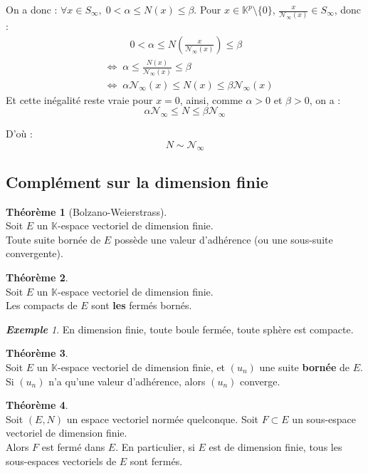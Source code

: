 \documentclass[12pt]{book}
\let\ensembleNombre\mathbb
\newcommand*\K{\ensuremath{\ensembleNombre{K}}}
\theoremstyle{definition}
\newtheorem{thme}{Théorème}[chapter]
\theoremstyle{remark}
\newtheorem*{ex}{\textbf{Exemple}}
\newenvironment{fthme}
  {\begin{mdframed}[roundcorner=10pt, linewidth=2pt]\begin{thme}}
  {\end{thme}\end{mdframed}}
\begin{document}
	On a donc : $\forall x \in S_\infty,\; 0 < \alpha \leq N(x) \leq \beta$. Pour $x \in \K^p \setminus \lbrace 0 \rbrace$, $\frac{x}{\mathcal N_\infty (x)} \in S_\infty$, donc :
	\begin{align*}
	&\;\;\qquad 0 < \alpha \leq N\left( \frac{x}{\mathcal N_\infty (x)} \right) \leq \beta \\
	&\Longleftrightarrow\; \alpha \leq \frac{N(x)}{\mathcal N_\infty (x)} \leq \beta \\
	&\Longleftrightarrow\; \alpha \mathcal N_\infty(x) \leq N(x) \leq \beta \mathcal N_\infty (x)
	\end{align*}
	Et cette inégalité reste vraie pour $x = 0$, ainsi, comme $\alpha > 0$ et $\beta > 0$, on a :
	\[ \alpha \mathcal N_\infty \leq N \leq \beta \mathcal N_\infty\]
	
	D'où : 
	\[\boxed{ N \sim \mathcal N_\infty}\]
	
	\subsection{Complément sur la dimension finie}
	\begin{fthme}[Bolzano-Weierstrass]\mbox{~}\\
	Soit $E$ un $\K$-espace vectoriel de dimension finie.\\
	Toute suite bornée de $E$ possède une valeur d'adhérence (ou une sous-suite convergente).
	\end{fthme}
	
	\begin{fthme}\mbox{~}\\
	Soit $E$ un $\K$-espace vectoriel de dimension finie.\\
	Les compacts de $E$ sont \textbf{les} fermés bornés.
	\end{fthme}
	
	\begin{ex}
	En dimension finie, toute boule fermée, toute sphère est compacte.
	\end{ex}
	
	\begin{fthme}\mbox{~}\\
	Soit $E$ un $\K$-espace vectoriel de dimension finie, et $(u_n)$ une suite \textbf{bornée} de $E$.\\
	Si $(u_n)$ n'a qu'une valeur d'adhérence, alors $(u_n)$ converge.
	\end{fthme}
	
	\begin{fthme}\mbox{~}\\
	Soit $(E,N)$ un espace vectoriel normée quelconque. Soit $F \subset E$ un sous-espace vectoriel de dimension finie.\\
	Alors $F$ est fermé dans $E$. En particulier, si $E$ est de dimension finie, tous les sous-espaces vectoriels de $E$ sont fermés.
	\end{fthme}
	
\end{document}
